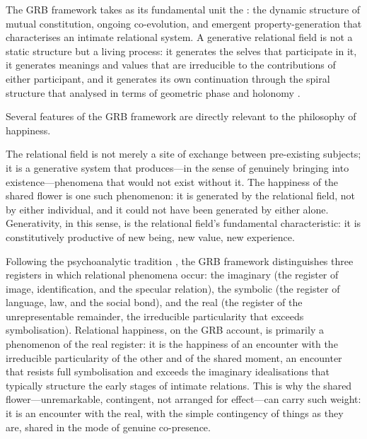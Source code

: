 The GRB framework takes as its fundamental unit the : the dynamic structure of mutual constitution, ongoing co-evolution, and emergent property-generation that characterises an intimate relational system. A generative relational field is not a static structure but a living process: it generates the selves that participate in it, it generates meanings and values that are irreducible to the contributions of either participant, and it generates its own continuation through the spiral structure that  analysed in terms of geometric phase and holonomy \parencite{paperix}.

Several features of the GRB framework are directly relevant to the philosophy of happiness.

 The relational field is not merely a site of exchange between pre-existing subjects; it is a generative system that produces---in the sense of genuinely bringing into existence---phenomena that would not exist without it. The happiness of the shared flower is one such phenomenon: it is generated by the relational field, not by either individual, and it could not have been generated by either alone. Generativity, in this sense, is the relational field's fundamental characteristic: it is constitutively productive of new being, new value, new experience.

 Following the psychoanalytic tradition \parencite{lacan2006}, the GRB framework distinguishes three registers in which relational phenomena occur: the imaginary (the register of image, identification, and the specular relation), the symbolic (the register of language, law, and the social bond), and the real (the register of the unrepresentable remainder, the irreducible particularity that exceeds symbolisation). Relational happiness, on the GRB account, is primarily a phenomenon of the real register: it is the happiness of an encounter with the irreducible particularity of the other and of the shared moment, an encounter that resists full symbolisation and exceeds the imaginary idealisations that typically structure the early stages of intimate relations. This is why the shared flower---unremarkable, contingent, not arranged for effect---can carry such weight: it is an encounter with the real, with the simple contingency of things as they are, shared in the mode of genuine co-presence.

